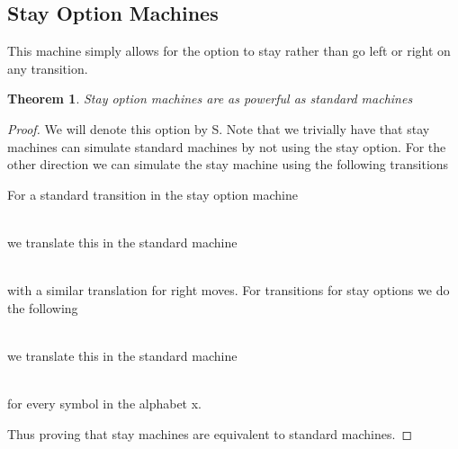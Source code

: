 \documentclass[11pt]{exam}
\newtheorem{theorem}{Theorem}[section]
\begin{document}
\subsection{Stay Option Machines}
This machine simply allows for the option to stay rather than go left or right on any transition.
\begin{theorem}
Stay option machines are as powerful as standard machines
\end{theorem}
\begin{proof}
We will denote this option by S. Note that we trivially have that stay machines can simulate 
standard machines by not using the stay option. For the other direction we can simulate the 
stay machine using the following transitions\\
\begin{center}
For a standard transition in the stay option machine\\ 

\\

we translate this in the standard machine\\

\\

with a similar  translation for right moves. For transitions for stay options we do the following\\

\\

we translate this in the standard machine\\

\\
for every symbol in the alphabet x.
\end{center}
Thus proving that stay machines are equivalent to standard machines.
\end{proof}
\end{document}
